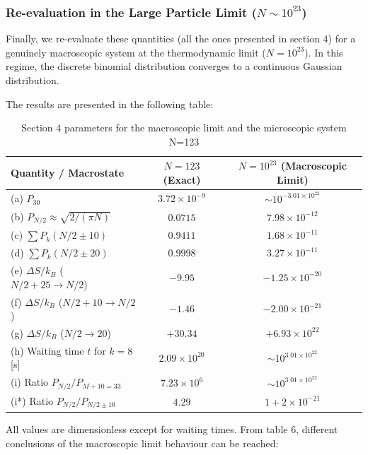 \documentclass[10pt, a4paper]{article}
\begin{document}
\subsubsection{Re-evaluation in the Large Particle Limit ($N \sim 10^{23}$)}
Finally, we re-evaluate these quantities (all the ones presented in section 4) for a genuinely macroscopic system at the thermodynamic limit ($N = 10^{23}$). In this regime, the discrete binomial distribution converges to a continuous Gaussian distribution.

The results are presented in the following table:

\begin{table}[htbp]
\centering 
\begin{tabular}{lcc}
\toprule
\textbf{Quantity / Macrostate} & \textbf{$N = 123$ (Exact)} & \textbf{$N = 10^{23}$ (Macroscopic Limit)} \\
\midrule
(a) $P_{30}$ & $3.72 \times 10^{-9}$ & $\sim 10^{-3.01 \times 10^{22}}$ \\
(b) $P_{N/2} \approx \sqrt{2/(\pi N)}$ & $0.0715$ & $7.98 \times 10^{-12}$ \\
(c) $\sum P_k(N/2 \pm 10)$ & $0.9411$ & $1.68 \times 10^{-11}$ \\
(d) $\sum P_k(N/2 \pm 20)$ & $0.9998$ & $3.27 \times 10^{-11}$ \\
(e) $\Delta S/k_B$ ($N/2+25 \to N/2$) & $-9.95$ & $-1.25 \times 10^{-20}$ \\
(f) $\Delta S/k_B$ ($N/2+10 \to N/2$) & $-1.46$ & $-2.00 \times 10^{-21}$ \\
(g) $\Delta S/k_B$ ($N/2 \to 20$) & $+30.34$ & $+6.93 \times 10^{22}$ \\
(h) Waiting time $t$ for $k=8$ [s] & $2.09 \times 10^{20}$ & $\sim 10^{3.01 \times 10^{22}}$ \\
(i) Ratio $P_{N/2} / P_{M+10=33}$ & $7.23 \times 10^{6}$ & $\sim 10^{3.01 \times 10^{22}}$ \\
(i*) Ratio $P_{N/2} / P_{N/2 \pm 10}$ & $4.29$ & $1 + 2 \times 10^{-21}$ \\
\bottomrule
\end{tabular}
\caption{Section 4 parameters for the macroscopic limit and the microscopic system N=123}
\end{table}

All values are dimensionless except for waiting times. From table 6, different conclusions of the macroscopic limit behaviour can be reached:
\end{document}
